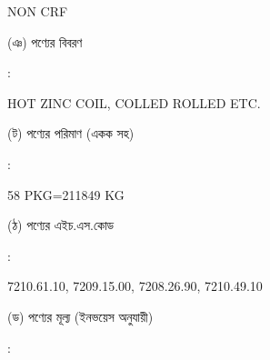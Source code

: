 \documentclass[12pt]{article}
\newcommand{\good}{HOT ZINC COIL, COLLED ROLLED ETC.}
\newcommand{\pkg}{58 PKG=211849 KG}
\newcommand{\hscode}{7210.61.10, 7209.15.00, 7208.26.90, 7210.49.10}
\newcommand{\crf}{NON CRF}
\newcommand{\crfdt}{}
\begin{document}
\begin{minipage}[t]{0.53\linewidth}
{\crf} \hspace{2em} {\crfdt}
\\
\end{minipage}
\begin{minipage}[t]{0.05\linewidth}
\hspace*{1em}
\end{minipage}
\begin{minipage}[t]{0.40\linewidth}
(ঞ) পণ্যের বিবরণ
\end{minipage}
\begin{minipage}[t]{0.02\linewidth}
:
\end{minipage}
\begin{minipage}[t]{0.53\linewidth}
{\good}
\\
\end{minipage}
\begin{minipage}[t]{0.05\linewidth}
\hspace*{1em}
\end{minipage}
\begin{minipage}[t]{0.40\linewidth}
(ট) পণ্যের পরিমাণ (একক সহ)
\end{minipage}
\begin{minipage}[t]{0.02\linewidth}
:
\end{minipage}
\begin{minipage}[t]{0.53\linewidth}
{\pkg}
\\
\end{minipage}
\begin{minipage}[t]{0.05\linewidth}
\hspace*{1em}
\end{minipage}
\begin{minipage}[t]{0.40\linewidth}
(ঠ) পণ্যের এইচ.এস.কোড
\end{minipage}
\begin{minipage}[t]{0.02\linewidth}
:
\end{minipage}
\begin{minipage}[t]{0.53\linewidth}
{\hscode}
\\
\end{minipage}
\begin{minipage}[t]{0.05\linewidth}
\hspace*{1em}
\end{minipage}
\begin{minipage}[t]{0.40\linewidth}
(ড) পণ্যের মূল্য (ইনভয়েস অনুযায়ী)
\end{minipage}
\begin{minipage}[t]{0.02\linewidth}
:
\end{minipage}
\end{document}
